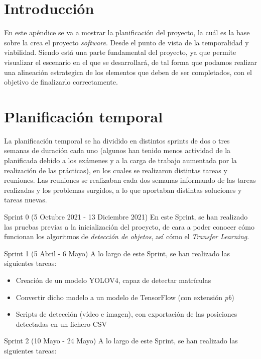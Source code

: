 
\section{Introducción}
En este apéndice se va a mostrar la planificación del proyecto, la cuál es la base sobre la crea el proyecto \textit{software}. Desde el punto de vista de la temporalidad y viabilidad. 
Siendo está una parte fundamental del proyecto, ya que permite visualizar el escenario en el que se desarrollará, de tal forma que podamos realizar una alineación estrategica de los elementos que deben de ser completados, con el objetivo de finalizarlo correctamente.

\section{Planificación temporal}
La planificación temporal se ha dividido en distintos sprints de dos o tres semanas de duración cada uno (algunos han tenido menos actividad de la planificada debido a los exámenes y a la carga de trabajo aumentada por la realización de las prácticas), en los cuales se realizaron distintas tareas y reuniones. Las reuniones se realizaban cada dos semanas informando de
las tareas realizadas y los problemas surgidos, a lo que aportaban distintas soluciones y tareas nuevas.

Sprint 0 (5 Octubre 2021 - 13 Diciembre 2021)
En este Sprint, se han realizado las pruebas previas a la inicialización del proeycto, de cara a poder conocer cómo funcionan los algoritmos de \textit{detección de objetos}, así cómo el \textit{Transfer Learning}.

\clearpage

Sprint 1 (5 Abril - 6 Mayo)
A lo largo de este Sprint, se han realizado las siguientes tareas:

\begin{itemize}
    \item Creación de un modelo YOLOV4, capaz de detectar matrículas
    \item Convertir dicho modelo a un modelo de TensorFlow (con extensión \textit{pb})
    \item Scripts de detección (vídeo e imagen), con exportación de las posiciones detectadas en un fichero CSV
\end{itemize}

Sprint 2 (10 Mayo - 24 Mayo)
A lo largo de este Sprint, se han realizado las siguientes tareas:


